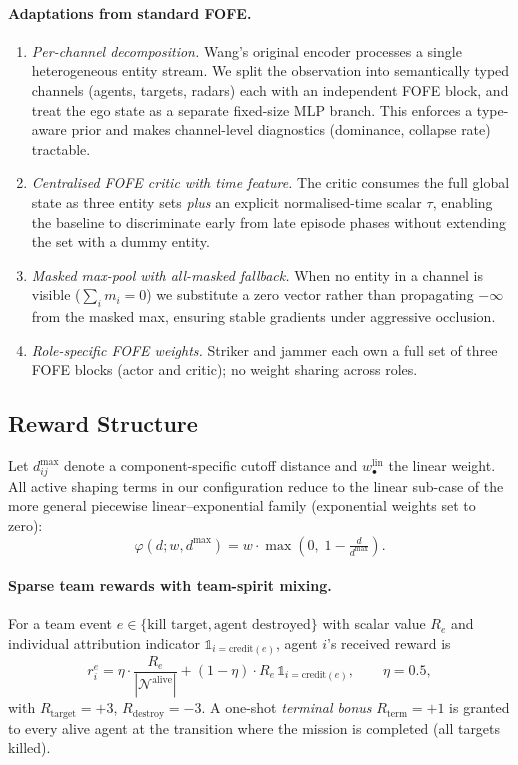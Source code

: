 \documentclass[11pt,a4paper]{article}
\begin{document}
\paragraph{Adaptations from standard FOFE.}
\begin{enumerate}[leftmargin=1.25em]
\item \emph{Per-channel decomposition.} Wang's original encoder processes a
single heterogeneous entity stream. We split the observation into
semantically typed channels (agents, targets, radars) each with an
independent FOFE block, and treat the ego state as a separate fixed-size
MLP branch. This enforces a type-aware prior and makes channel-level
diagnostics (dominance, collapse rate) tractable.
\item \emph{Centralised FOFE critic with time feature.} The critic
consumes the full global state as three entity sets \emph{plus} an explicit
normalised-time scalar $\tau$, enabling the baseline to discriminate early
from late episode phases without extending the set with a dummy entity.
\item \emph{Masked max-pool with all-masked fallback.} When no entity in a
channel is visible ($\sum_i m_i=0$) we substitute a zero vector rather
than propagating $-\infty$ from the masked max, ensuring stable gradients
under aggressive occlusion.
\item \emph{Role-specific FOFE weights.} Striker and jammer each own a full
set of three FOFE blocks (actor and critic); no weight sharing across roles.
\end{enumerate}

\subsection{Reward Structure}
\label{subsec:rewards}
Let $d^{\max}_{ij}$ denote a component-specific cutoff distance and
$w^{\text{lin}}_{\bullet}$ the linear weight. All active shaping terms in our
configuration reduce to the linear sub-case of the more general
piecewise linear--exponential family (exponential weights set to zero):
\begin{equation}
\varphi(d;w,d^{\max})=w\cdot\max\!\left(0,\;1-\tfrac{d}{d^{\max}}\right).
\end{equation}

\paragraph{Sparse team rewards with team-spirit mixing.}
For a team event $e\in\{\text{kill target},\text{agent destroyed}\}$ with
scalar value $R_e$ and individual attribution indicator
$\mathbb{1}_{i=\text{credit}(e)}$, agent $i$'s received reward is
\begin{equation}
r_i^{e} = \eta \cdot \frac{R_e}{|\mathcal N^\text{alive}|}
       + (1-\eta)\cdot R_e\,\mathbb{1}_{i=\text{credit}(e)},
\qquad \eta=0.5,
\end{equation}
with $R_{\text{target}}=+3$, $R_{\text{destroy}}=-3$. A one-shot
\emph{terminal bonus} $R_{\text{term}}=+1$ is granted to every alive agent
at the transition where the mission is completed (all targets killed).
\end{document}

